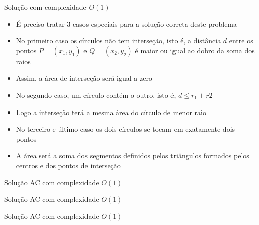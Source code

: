 \begin{frame}[fragile]{Solução com complexidade $O(1)$}

    \begin{itemize}
        \item É preciso tratar 3 casos especiais para a solução correta deste problema
        \pause

        \item No primeiro caso os círculos não tem interseção, isto é, a distância $d$ entre os
            pontos $P = (x_1, y_1)$ e $Q = (x_2, y_2)$ é maior ou igual ao dobro da soma dos
            raios
        \pause

        \item Assim, a área de interseção será igual a zero
        \pause

        \item No segundo caso, um círculo contém o outro, isto é, $d \leq r_1 + r2$
        \pause

        \item Logo a interseção terá a mesma área do círculo de menor raio
        \pause

        \item No terceiro e último caso os dois círculos se tocam em exatamente dois pontos
        \pause

        \item A área será a soma dos segmentos definidos pelos triângulos formados pelos
            centros e dos pontos de interseção
    \end{itemize}

\end{frame}

\begin{frame}[fragile]{Solução AC com complexidade $O(1)$}
\end{frame}

\begin{frame}[fragile]{Solução AC com complexidade $O(1)$}
\end{frame}

\begin{frame}[fragile]{Solução AC com complexidade $O(1)$}
\end{frame}
